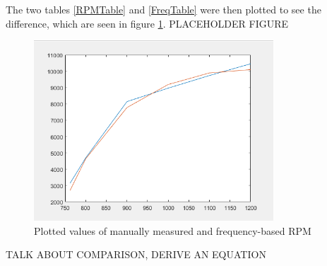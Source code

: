 The two tables \ref{RPMTable} and \ref{FreqTable} were then plotted to see the difference, which are seen in figure \ref{RPMvsFreq}.
PLACEHOLDER FIGURE
\begin{figure}[H]
  \centering
    \includegraphics[width=0.8\textwidth]{images/RPMvsFreq.png}
	\caption{Plotted values of manually measured and frequency-based RPM}
	\label{RPMvsFreq}
\end{figure}

TALK ABOUT COMPARISON, DERIVE AN EQUATION
